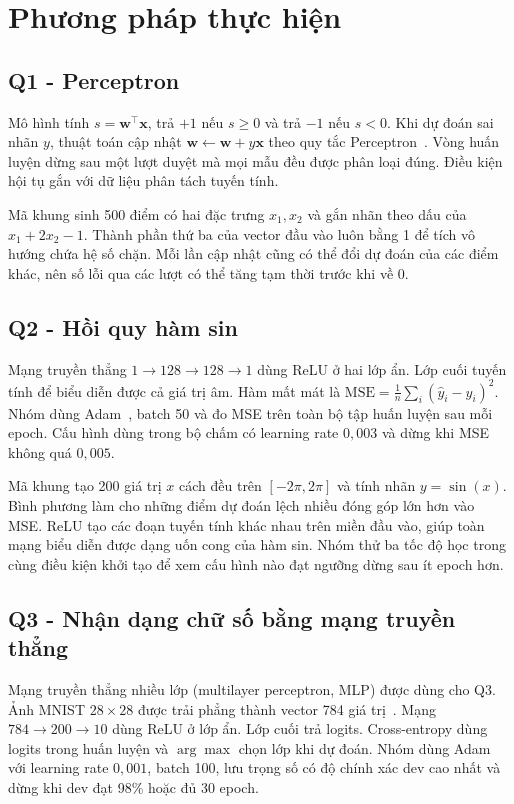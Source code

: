 \documentclass[conference]{IEEEtran}
\begin{document}
\section{Phương pháp thực hiện}
\subsection{Q1 - Perceptron}
Mô hình tính \(s=\mathbf w^\top\mathbf x\), trả \(+1\) nếu \(s\ge 0\) và trả \(-1\) nếu \(s<0\). Khi dự đoán sai nhãn \(y\), thuật toán cập nhật \(\mathbf w\leftarrow\mathbf w+y\mathbf x\) theo quy tắc Perceptron~\cite{rosenblatt}. Vòng huấn luyện dừng sau một lượt duyệt mà mọi mẫu đều được phân loại đúng. Điều kiện hội tụ gắn với dữ liệu phân tách tuyến tính.

Mã khung sinh 500 điểm có hai đặc trưng \(x_1,x_2\) và gắn nhãn theo dấu của \(x_1+2x_2-1\). Thành phần thứ ba của vector đầu vào luôn bằng 1 để tích vô hướng chứa hệ số chặn. Mỗi lần cập nhật cũng có thể đổi dự đoán của các điểm khác, nên số lỗi qua các lượt có thể tăng tạm thời trước khi về 0.

\subsection{Q2 - Hồi quy hàm sin}
Mạng truyền thẳng \(1\to128\to128\to1\) dùng ReLU ở hai lớp ẩn. Lớp cuối tuyến tính để biểu diễn được cả giá trị âm. Hàm mất mát là \(\mathrm{MSE}=\tfrac1n\sum_i(\hat y_i-y_i)^2\). Nhóm dùng Adam~\cite{adam}, batch 50 và đo MSE trên toàn bộ tập huấn luyện sau mỗi epoch. Cấu hình dùng trong bộ chấm có learning rate \(0{,}003\) và dừng khi MSE không quá \(0{,}005\).

Mã khung tạo 200 giá trị \(x\) cách đều trên \([-2\pi,2\pi]\) và tính nhãn \(y=\sin(x)\). Bình phương làm cho những điểm dự đoán lệch nhiều đóng góp lớn hơn vào MSE. ReLU tạo các đoạn tuyến tính khác nhau trên miền đầu vào, giúp toàn mạng biểu diễn được dạng uốn cong của hàm sin. Nhóm thử ba tốc độ học trong cùng điều kiện khởi tạo để xem cấu hình nào đạt ngưỡng dừng sau ít epoch hơn.

\subsection{Q3 - Nhận dạng chữ số bằng mạng truyền thẳng}
Mạng truyền thẳng nhiều lớp (multilayer perceptron, MLP) được dùng cho Q3. Ảnh MNIST \(28\times28\) được trải phẳng thành vector 784 giá trị~\cite{mnist}. Mạng \(784\to200\to10\) dùng ReLU ở lớp ẩn. Lớp cuối trả logits. Cross-entropy dùng logits trong huấn luyện và \(\arg\max\) chọn lớp khi dự đoán. Nhóm dùng Adam với learning rate \(0{,}001\), batch 100, lưu trọng số có độ chính xác dev cao nhất và dừng khi dev đạt 98\% hoặc đủ 30 epoch.
\end{document}
